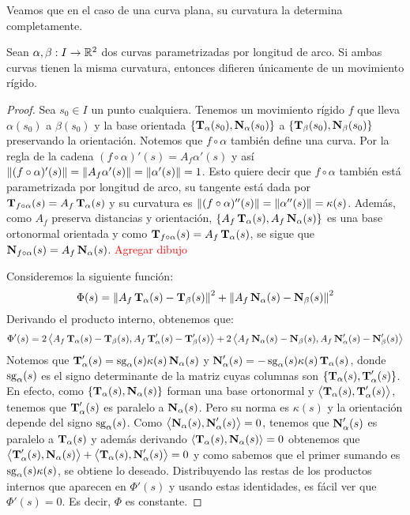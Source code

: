Veamos que en el caso de una curva plana, su curvatura la determina completamente.

\begin{teo}
Sean $\alpha,\beta:I\to\RR^2$ dos curvas parametrizadas por longitud de arco. Si ambas curvas tienen la misma curvatura, entonces difieren únicamente de un movimiento rígido.
\begin{proof}
Sea $s_0\in I$ un punto cualquiera. Tenemos un movimiento rígido $f$ que lleva $\alpha(s_0)$ a $\beta(s_0)$ y la base orientada $\{\T_\alpha(s_0),\N_\alpha(s_0)\}$ a $\{\T_\beta(s_0),\N_\beta(s_0)\}$ preservando la orientación. Notemos que $f\circ\alpha$ también define una curva. Por la regla de la cadena $(f\circ\alpha)'(s)=A_f\alpha'(s)$ y así $\norm{(f\circ\alpha)'(s)}=\norm{A_f\alpha'(s)}=\norm{\alpha'(s)}=1$. Esto quiere decir que $f\circ\alpha$ también está parametrizada por longitud de arco, su tangente está dada por $\T_{f\circ\alpha}(s)=A_f\T_{\alpha}(s)$ y su curvatura es $\norm{(f\circ\alpha)''(s)}=\norm{\alpha''(s)}=\kappa(s)$. Además, como $A_f$ preserva distancias y orientación, $\{A_f\T_\alpha(s),A_f\N_\alpha(s)\}$ es una base ortonormal orientada y como $\T_{f\circ\alpha}(s)=A_f\T_\alpha(s)$, se sigue que $\N_{f\circ\alpha}(s)=A_f\N_\alpha(s)$. \textcolor{red}{Agregar dibujo}

Consideremos la siguiente función: $$\Phi(s)=\norm{A_f\T_\alpha(s) - \T_\beta(s)}^2 + \norm{A_f\N_\alpha(s)-\N_\beta(s)}^2$$ Derivando el producto interno, obtenemos que: $$\Phi'(s)=2\pint{A_f\T_\alpha(s)-\T_\beta(s),A_f\T'_\alpha(s)-\T'_\beta(s)} + 2\pint{A_f\N_\alpha(s)-\N_\beta(s),A_f\N'_\alpha(s)-\N'_\beta(s)}$$ Notemos que $\T'_\alpha(s)=\sg_\alpha(s)\kappa(s)\N_\alpha(s)$ y $\N'_\alpha(s)=-\sg_\alpha(s)\kappa(s)\T_\alpha(s)$, donde $\sg_\alpha(s)$ es el signo determinante de la matriz cuyas columnas son $\{\T_\alpha(s),\T'_\alpha(s)\}$. En efecto, como $\{\T_\alpha(s),\N_\alpha(s)\}$ forman una base ortonormal y $\pint{\T_\alpha(s),\T'_\alpha(s)}$, tenemos que $\T'_\alpha(s)$ es paralelo a $\N_\alpha(s)$. Pero su norma es $\kappa(s)$ y la orientación depende del signo $\sg_\alpha(s)$. Como $\pint{\N_\alpha(s),\N'_\alpha(s)}=0$, tenemos que $\N'_\alpha(s)$ es paralelo a $\T_\alpha(s)$ y además derivando $\pint{\T_\alpha(s),\N_\alpha(s)}=0$ obtenemos que $\pint{\T'_\alpha(s),\N_\alpha(s)}+\pint{\T_\alpha(s),\N'_\alpha(s)} = 0$ y como sabemos que el primer sumando es $\sg_\alpha(s)\kappa(s)$, se obtiene lo deseado. Distribuyendo las restas de los productos internos que aparecen en $\Phi'(s)$ y usando estas identidades, es fácil ver que $\Phi'(s)=0$. Es decir, $\Phi$ es constante.


\end{proof}
\end{teo}
